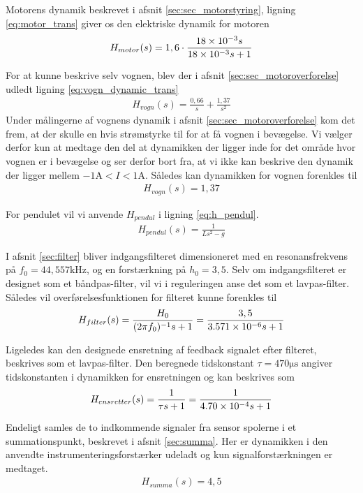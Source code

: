 Motorens dynamik beskrevet i afsnit \ref{sec:sec_motorstyring}, ligning \ref{eq:motor_trans} giver os den elektriske dynamik for motoren
\begin{align}
H_{motor}(s) = 1,6 \cdot \frac{\num{18E-3}s}{\num{18E-3}s +1}
\end{align}

For at kunne beskrive selv vognen, blev der i afsnit \ref{sec:sec_motoroverforelse} udledt ligning \ref{eq:vogn_dynamic_trans}
\begin{align}
H_{vogn}(s) =\frac{0,66}{s} + \frac{1,37}{s^2} 
\end{align}
Under målingerne af vognens dynamik i afsnit \ref{sec:sec_motoroverforelse} kom det frem, at der skulle en hvis strømstyrke til for at få vognen i bevægelse.
Vi vælger derfor kun at medtage den del at dynamikken der ligger inde for det område hvor vognen er i bevægelse og ser derfor bort fra, at vi ikke kan beskrive den dynamik der ligger mellem $-1 \si{\ampere} < I < 1 \si{\ampere}$. 
Således kan dynamikken for vognen forenkles til
\begin{align}
 H_{vogn}(s) = 1,37
\end{align}

For pendulet vil vi anvende $H_{pendul}$ i ligning \ref{eq:h_pendul}.
\begin{align}
H_{pendul}(s) = \frac{1}{Ls^2 - g} 
\end{align}

I afsnit \ref{sec:filter} bliver indgangsfilteret dimensioneret med en resonansfrekvens på $f_0 = 44,557 \si{\kilo\hertz}$, og en forstærkning på $h_0 = 3,5$. 
Selv om indgangsfilteret er designet som et båndpas-filter, vil vi i reguleringen anse det som et lavpas-filter.
Således vil overførelsesfunktionen for filteret kunne forenkles til 
\begin{align}
H_{filter}(s) = \frac{H_0}{(2 \pi f_0)^{-1}s +1} = \frac{3,5}{\num{3.571E-06}s +1}
\end{align}

Ligeledes kan den designede ensretning af feedback signalet efter filteret, beskrives som et lavpas-filter.
Den beregnede tidskonstant $\tau = 470 \si{\micro\second}$ angiver tidskonstanten i dynamikken for ensretningen og kan beskrives som
\begin{align}
H_{ensretter}(s) = \frac{1}{\tau s +1} = \frac{1}{\num{4.70E-4}s +1}
\end{align} 

Endeligt samles de to indkommende signaler fra sensor spolerne i et summationspunkt, beskrevet i afsnit \ref{sec:summa}.
Her er dynamikken i den anvendte instrumenteringsforstærker udeladt og kun signalforstærkningen er medtaget.
\begin{align}
H_{summa}(s) = 4,5
\end{align}  

